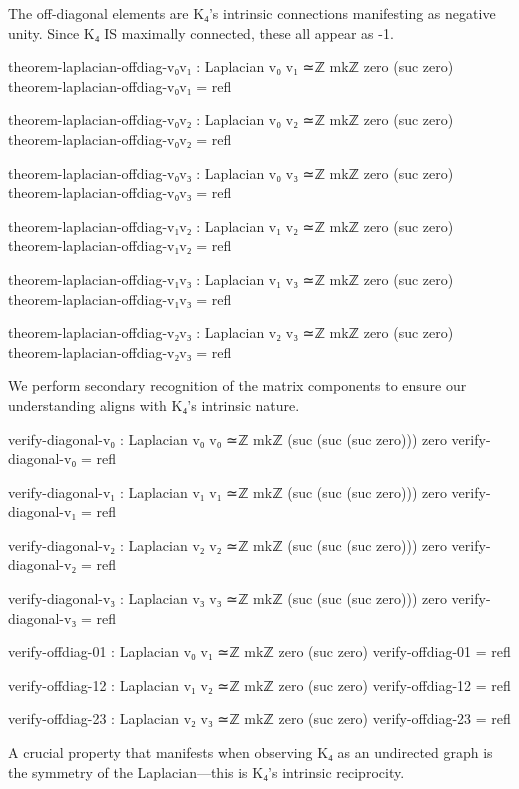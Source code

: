 \documentclass[11pt,a4paper]{book}
\begin{document}
The off-diagonal elements are K₄'s intrinsic connections manifesting as negative unity. Since K₄ IS maximally connected, these all appear as -1.

\begin{code}
theorem-laplacian-offdiag-v₀v₁ : Laplacian v₀ v₁ ≃ℤ mkℤ zero (suc zero)
theorem-laplacian-offdiag-v₀v₁ = refl

theorem-laplacian-offdiag-v₀v₂ : Laplacian v₀ v₂ ≃ℤ mkℤ zero (suc zero)
theorem-laplacian-offdiag-v₀v₂ = refl

theorem-laplacian-offdiag-v₀v₃ : Laplacian v₀ v₃ ≃ℤ mkℤ zero (suc zero)
theorem-laplacian-offdiag-v₀v₃ = refl

theorem-laplacian-offdiag-v₁v₂ : Laplacian v₁ v₂ ≃ℤ mkℤ zero (suc zero)
theorem-laplacian-offdiag-v₁v₂ = refl

theorem-laplacian-offdiag-v₁v₃ : Laplacian v₁ v₃ ≃ℤ mkℤ zero (suc zero)
theorem-laplacian-offdiag-v₁v₃ = refl

theorem-laplacian-offdiag-v₂v₃ : Laplacian v₂ v₃ ≃ℤ mkℤ zero (suc zero)
theorem-laplacian-offdiag-v₂v₃ = refl

\end{code}

We perform secondary recognition of the matrix components to ensure our understanding aligns with K₄'s intrinsic nature.

\begin{code}
verify-diagonal-v₀ : Laplacian v₀ v₀ ≃ℤ mkℤ (suc (suc (suc zero))) zero
verify-diagonal-v₀ = refl

verify-diagonal-v₁ : Laplacian v₁ v₁ ≃ℤ mkℤ (suc (suc (suc zero))) zero
verify-diagonal-v₁ = refl

verify-diagonal-v₂ : Laplacian v₂ v₂ ≃ℤ mkℤ (suc (suc (suc zero))) zero
verify-diagonal-v₂ = refl

verify-diagonal-v₃ : Laplacian v₃ v₃ ≃ℤ mkℤ (suc (suc (suc zero))) zero
verify-diagonal-v₃ = refl

verify-offdiag-01 : Laplacian v₀ v₁ ≃ℤ mkℤ zero (suc zero)
verify-offdiag-01 = refl

verify-offdiag-12 : Laplacian v₁ v₂ ≃ℤ mkℤ zero (suc zero)
verify-offdiag-12 = refl

verify-offdiag-23 : Laplacian v₂ v₃ ≃ℤ mkℤ zero (suc zero)
verify-offdiag-23 = refl

\end{code}

A crucial property that manifests when observing K₄ as an undirected graph is the symmetry of the Laplacian—this is K₄'s intrinsic reciprocity.
\end{document}
